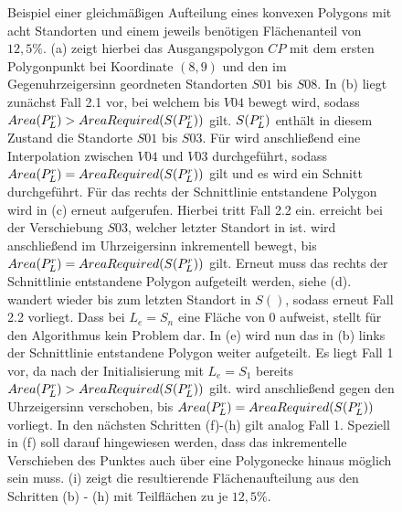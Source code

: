 \documentclass[ngerman]{seminarbeitrag}
\begin{document}
\begin{figure}[hb]
\caption{\small Beispiel einer gleichmäßigen Aufteilung eines konvexen Polygons mit acht Standorten und einem jeweils benötigen Flächenanteil von $12,5\%$. (a) zeigt hierbei das Ausgangspolygon $CP$ mit dem ersten Polygonpunkt bei Koordinate $(8, 9)$ und den im Gegenuhrzeigersinn geordneten Standorten $S01$ bis $S08$. In (b) liegt zunächst Fall 2.1 vor, bei welchem \Le bis $V04$ bewegt wird, sodass $Area(P_{L}^{r}) > AreaRequired(S(P_{L}^{r}))$ gilt. $S(P_{L}^{r})$ enthält in diesem Zustand die Standorte $S01$ bis $S03$. Für \Le wird anschließend eine Interpolation zwischen $V04$ und $V03$ durchgeführt, sodass $Area(P_{L}^{r}) = AreaRequired(S(P_{L}^{r}))$ gilt und es wird ein Schnitt durchgeführt. Für das rechts der Schnittlinie entstandene Polygon wird in (c) erneut \con aufgerufen. Hierbei tritt Fall 2.2 ein. \Le erreicht bei der Verschiebung $S03$, welcher letzter Standort in \s ist. \ls wird anschließend im Uhrzeigersinn inkrementell bewegt, bis $Area(P_{L}^{r}) = AreaRequired(S(P_{L}^{r}))$ gilt. Erneut muss das rechts der Schnittlinie entstandene Polygon aufgeteilt werden, siehe (d). \Le wandert wieder bis zum letzten Standort in $S()$, sodass erneut Fall 2.2 vorliegt. Dass \ar{\mprl} bei $L_{e} = S_{n}$ eine Fläche von 0 aufweist, stellt für den Algorithmus kein Problem dar. In (e) wird nun das in (b) links der Schnittlinie entstandene Polygon weiter aufgeteilt. Es liegt Fall 1 vor, da nach der Initialisierung mit $L_{e} = S_{1}$ bereits $Area(P_{L}^{r}) > AreaRequired(S(P_{L}^{r}))$ gilt. \ls wird anschließend gegen den Uhrzeigersinn verschoben, bis $Area(P_{L}^{r}) = AreaRequired(S(P_{L}^{r}))$ vorliegt. In den nächsten Schritten (f)-(h) gilt analog Fall 1. Speziell in (f) soll darauf hingewiesen werden, dass das inkrementelle Verschieben des Punktes \ls auch über eine Polygonecke hinaus möglich sein muss. (i) zeigt die resultierende Flächenaufteilung aus den Schritten (b) - (h) mit Teilflächen zu je $12,5\%$.}
\label{beispiel konvex}
\end{figure}
\end{document}

